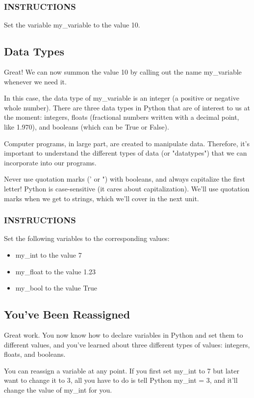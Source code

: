 \documentclass[12pt,a4paper,final,twoside,onecolumn,titlepage]{book}
\begin{document}
\subsubsection{INSTRUCTIONS}
Set the variable my\_variable to the value 10.

\subsection{Data Types}
Great! We can now summon the value 10 by calling out the name my\_variable whenever we need it.

In this case, the data type of my\_variable is an integer (a positive or negative whole number). There are three data types in Python that are of interest to us at the moment: integers, floats (fractional numbers written with a decimal point, like 1.970), and booleans (which can be True or False).

Computer programs, in large part, are created to manipulate data. Therefore, it's important to understand the different types of data (or "datatypes") that we can incorporate into our programs.

Never use quotation marks (' or ") with booleans, and always capitalize the first letter! Python is case-sensitive (it cares about capitalization). We'll use quotation marks when we get to strings, which we'll cover in the next unit.

\subsubsection{INSTRUCTIONS}
Set the following variables to the corresponding values:
\begin{itemize}
\item my\_int to the value 7
\item my\_float to the value 1.23
\item my\_bool to the value True
\end{itemize}

\subsection{You've Been Reassigned}
Great work. You now know how to declare variables in Python and set them to different values, and you've learned about three different types of values: integers, floats, and booleans.

You can reassign a variable at any point. If you first set my\_int to 7 but later want to change it to 3, all you have to do is tell Python my\_int = 3, and it'll change the value of my\_int for you.
\end{document}

